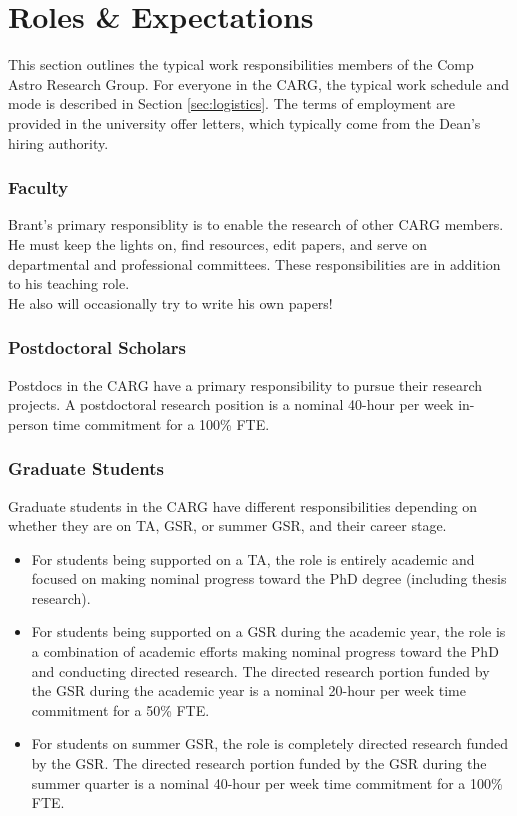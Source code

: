\section{Roles \& Expectations}
\label{sec:roles}

This section outlines the typical work responsibilities members of the Comp Astro Research Group.
For everyone in the CARG,
the typical work schedule and mode is described in Section \ref{sec:logistics}.
The terms of employment are provided in the university offer letters, which typically come from the Dean's hiring authority.

\subsubsection{Faculty}

Brant's primary responsiblity
is to enable the research
of other CARG members. He
must keep the lights on,
find resources, edit
papers, and serve on departmental
and professional committees. These
responsibilities are in addition to his
teaching role.\\

\noindent
He also will occasionally try to
write his own papers!


\subsubsection{Postdoctoral Scholars}

Postdocs in the CARG have
a primary responsibility
to pursue their research 
projects. A postdoctoral research position is a nominal 40-hour per week 
in-person time commitment for a 100\% FTE.

\subsubsection{Graduate Students}

Graduate students in the CARG have
different responsibilities
depending on whether they
are on TA, GSR, or summer GSR, and
their career stage.

\begin{itemize}
	\item For students being supported on a TA, the role is entirely academic and focused on making nominal progress toward the PhD degree (including thesis research).
	\item For students being supported on a GSR during the academic year, the role is a combination of academic efforts making nominal progress toward the PhD and conducting directed research. The directed research portion funded by the GSR during the academic year is a nominal 20-hour per week time commitment for a 50\% FTE.
	\item For students on summer GSR, the role is completely directed research funded by the GSR. The
	directed research portion funded by the GSR during the summer quarter is a nominal 40-hour per week time commitment for a 100\% FTE.
\end{itemize}

